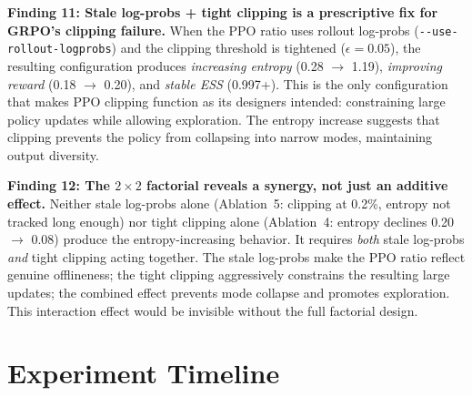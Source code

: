 \documentclass[11pt,a4paper]{article}
\begin{document}
\begin{keyinsight}
\textbf{Finding 11: Stale log-probs + tight clipping is a prescriptive fix
for GRPO's clipping failure.} When the PPO ratio uses rollout log-probs
(\texttt{-{}-use-rollout-logprobs}) and the clipping threshold is
tightened ($\epsilon = 0.05$), the resulting configuration produces
\emph{increasing entropy} (0.28 $\to$ 1.19), \emph{improving reward}
(0.18 $\to$ 0.20), and \emph{stable ESS} (0.997+). This is the only
configuration that makes PPO clipping function as its designers intended:
constraining large policy updates while allowing exploration. The entropy
increase suggests that clipping prevents the policy from collapsing into
narrow modes, maintaining output diversity.
\end{keyinsight}

\begin{keyinsight}
\textbf{Finding 12: The $2 \times 2$ factorial reveals a synergy, not
just an additive effect.} Neither stale log-probs alone (Ablation~5:
clipping at 0.2\%, entropy not tracked long enough) nor tight clipping
alone (Ablation~4: entropy declines 0.20 $\to$ 0.08) produce the
entropy-increasing behavior. It requires \emph{both} stale log-probs
\emph{and} tight clipping acting together. The stale log-probs make the
PPO ratio reflect genuine offlineness; the tight clipping aggressively
constrains the resulting large updates; the combined effect prevents
mode collapse and promotes exploration. This interaction effect would be
invisible without the full factorial design.
\end{keyinsight}


\section{Experiment Timeline}
\label{sec:timeline}
\end{document}
